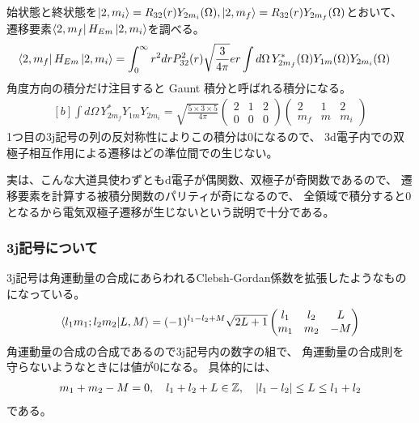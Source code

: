 \documentclass[../ap_2011.tex]{subfiles}
\begin{document}
始状態と終状態を\(\ket{2,m_i}=R_{32}(r)Y_{2m_i}(\Omega),\ket{2,m_f}=R_{32}(r)Y_{2m_f}(\Omega)\)とおいて、
遷移要素\(\bra{2,m_f}H_{Em}\ket{2,m_i}\)を調べる。
\begin{equation}\begin{aligned}[b]
    \bra{2,m_f}H_{Em}\ket{2,m_i}
    &= \int_{0}^{\infty}r^2dr P_{32}^2(r)\sqrt{\frac{3}{4\pi}}er\int d\Omega\, Y_{2m_f}^*(\Omega)Y_{1m}(\Omega)Y_{2m_i}(\Omega)
\end{aligned}\end{equation}
角度方向の積分だけ注目すると Gaunt 積分と呼ばれる積分になる。
\begin{equation}\begin{aligned}[b]
    \int d\Omega\, Y_{2m_f}^*Y_{1m}Y_{2m_i}
    = \sqrt{\frac{5\times 3 \times 5}{4\pi}}\begin{pmatrix}
        2 & 1 & 2\\
        0 & 0 & 0
    \end{pmatrix}\begin{pmatrix}
        2 & 1 & 2\\
        m_f  & m & m_i
    \end{pmatrix}
\end{aligned}\end{equation}
1つ目の3j記号の列の反対称性によりこの積分は0になるので、
3d電子内での双極子相互作用による遷移はどの準位間での生じない。

実は、こんな大道具使わずともd電子が偶関数、双極子が奇関数であるので、
遷移要素を計算する被積分関数のパリティが奇になるので、
全領域で積分すると0となるから電気双極子遷移が生じないという説明で十分である。

\subsubsection*{3j記号について}
3j記号は角運動量の合成にあらわれるClebsh-Gordan係数を拡張したようなものになっている。
\begin{equation}\begin{aligned}[b]
    \bra{l_1m_1;l_2m_2}\ket{L,M}=(-1)^{l_1-l_2+M}\sqrt{2L+1}\begin{pmatrix}
        l_1 &l_2&L\\
        m_1 &m_2&-M
    \end{pmatrix}
\end{aligned}\end{equation}
角運動量の合成の合成であるので3j記号内の数字の組で、
角運動量の合成則を守らないようなときには値が0になる。
具体的には、
\begin{equation}\begin{aligned}[b]
    m_1+m_2-M=0,\quad l_1+l_2+L \in \mathbb{Z},\quad \abs{l_1-l_2}\leq L \leq l_1+l_2
\end{aligned}\end{equation}
である。
\end{document}
